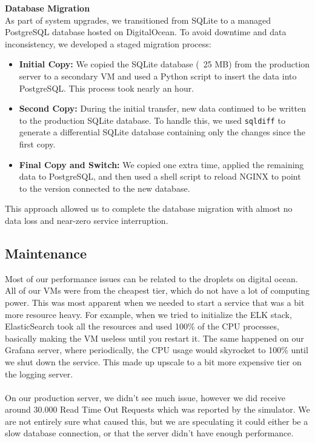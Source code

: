 \noindent \textbf{Database Migration}
\\
As part of system upgrades, we transitioned from SQLite to a managed PostgreSQL database hosted on DigitalOcean. To avoid downtime and data inconsistency, we developed a staged migration process:
\begin{itemize}
    \item \textbf{Initial Copy:} We copied the SQLite database (~25 MB) from the production server to a secondary VM and used a Python script to insert the data into PostgreSQL. This process took nearly an hour.
    \item \textbf{Second Copy:} During the initial transfer, new data continued to be written to the production SQLite database. To handle this, we used \texttt{sqldiff} to generate a differential SQLite database containing only the changes since the first copy.
    \item \textbf{Final Copy and Switch:} We copied one extra time, applied the remaining data to PostgreSQL, and then used a shell script to reload NGINX to point to the version connected to the new database.
\end{itemize}

This approach allowed us to complete the database migration with almost no data loss and near-zero service interruption.

\subsection{Maintenance}

Most of our performance issues can be related to the droplets on digital ocean. All of our VMs were from the cheapest tier, which do not have a lot of computing power. This was most apparent when we needed to start a service that was a bit more resource heavy. For example, when we tried to initialize the ELK stack, ElasticSearch took all the resources and used 100\% of the CPU processes, basically making the VM useless until you restart it. The same happened on our Grafana server, where periodically, the CPU usage would skyrocket to 100\% until we shut down the service. This made up upscale to a bit more expensive tier on the logging server.
\\
\\
On our production server, we didn't see much issue, however we did receive around 30.000 Read Time Out Requests which was reported by the simulator. We are not entirely sure what caused this, but we are speculating it could either be a slow database connection, or that the server didn't have enough performance.

